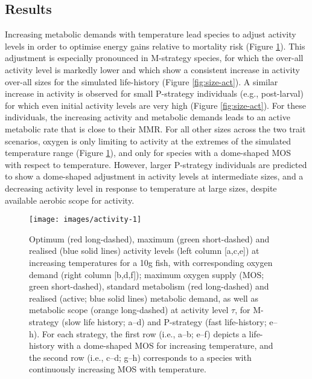 \documentclass[a4paper, toc=index,abstract=true]{scrartcl}\usepackage[]{graphicx}\usepackage[]{color}
\makeatletter
\def\maxwidth{ %
  \ifdim\Gin@nat@width>\linewidth
    \linewidth
  \else
    \Gin@nat@width
  \fi
}
\makeatother
\begin{document}
\begin{spacing}{1.9}
\section{Results}

Increasing metabolic demands with temperature lead species to adjust activity levels in order to optimise energy gains relative to mortality risk (Figure \ref{fig:activity}). This adjustment is especially pronounced in M-strategy species, for which the over-all activity level is markedly lower and which show a consistent increase in activity over-all sizes for the simulated life-history (Figure \ref{fig:size-act}). A similar increase in activity is observed for small P-strategy individuals (e.g., post-larval) for which even initial activity levels are very high (Figure \ref{fig:size-act}). For these individuals, the increasing activity and metabolic demands leads to an active metabolic rate that is close to their MMR. For all other sizes across the two trait scenarios, oxygen is only limiting to activity at the extremes of the simulated temperature range (Figure \ref{fig:activity}), and only for species with a dome-shaped MOS with respect to temperature. However, larger P-strategy individuals are predicted to show a dome-shaped adjustment in activity levels at intermediate sizes, and a decreasing activity level in response to temperature at large sizes, despite available aerobic scope for activity.

\begin{figure}
\centering

\texttt{[image: images/activity-1]} 

\caption{Optimum (red long-dashed), maximum (green short-dashed) and realised (blue solid lines) activity levels (left column [a,c,e]) at increasing temperatures for a 10g fish, with corresponding oxygen demand (right column [b,d,f]); maximum oxygen supply (MOS; green short-dashed), standard metabolism (red long-dashed) and realised (active; blue solid lines) metabolic demand, as well as metabolic scope (orange long-dashed) at activity level $\tau$, for M-strategy (slow life history; a--d) and P-strategy (fast life-history; e--h). For each strategy, the first row (i.e., a--b; e--f) depicts a life-history with a dome-shaped MOS for increasing temperature, and the second row (i.e., c--d; g--h) corresponds to a species with continuously increasing MOS with temperature.}
\label{fig:activity}
\end{figure}

\begin{figure}


\end{figure}
\end{spacing}
\end{document}
